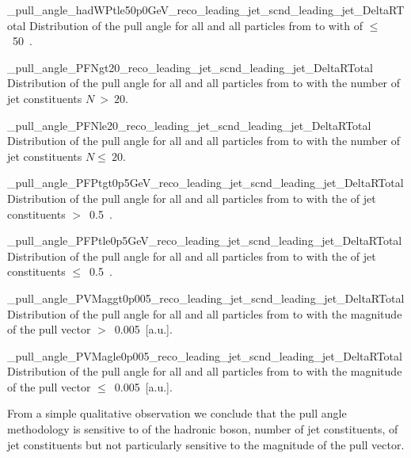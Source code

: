      {_pull_angle_hadWPtle50p0GeV_reco_leading_jet_scnd_leading_jet_DeltaRTotal}
     {Distribution of the pull angle for all \DeltaR and all particles from \leadingjet to \scndleadingjet with \pt of \PW $\leq$~50~\GeV.}

     {_pull_angle_PFNgt20_reco_leading_jet_scnd_leading_jet_DeltaRTotal}
     {Distribution of the pull angle for all \DeltaR and all particles from \leadingjet to \scndleadingjet with the number of jet constituents $N~>~20$.}

     {_pull_angle_PFNle20_reco_leading_jet_scnd_leading_jet_DeltaRTotal}
     {Distribution of the pull angle for all \DeltaR and all particles from \leadingjet to \scndleadingjet with the number of jet constituents $N\leq~20$.}

     {_pull_angle_PFPtgt0p5GeV_reco_leading_jet_scnd_leading_jet_DeltaRTotal}
     {Distribution of the pull angle for all \DeltaR and all particles from \leadingjet to \scndleadingjet with the \pt of jet constituents $>$~0.5~\GeV.}

     {_pull_angle_PFPtle0p5GeV_reco_leading_jet_scnd_leading_jet_DeltaRTotal}
     {Distribution of the pull angle for all \DeltaR and all particles from \leadingjet to \scndleadingjet with the \pt of jet constituents $\leq$~0.5~\GeV.}

     {_pull_angle_PVMaggt0p005_reco_leading_jet_scnd_leading_jet_DeltaRTotal}
     {Distribution of the pull angle for all \DeltaR and all particles from \leadingjet to \scndleadingjet with the magnitude of the pull vector $>$~0.005~[a.u.].}

    {_pull_angle_PVMagle0p005_reco_leading_jet_scnd_leading_jet_DeltaRTotal}
    {Distribution of the pull angle for all \DeltaR and all particles from \leadingjet to \scndleadingjet with the magnitude of the pull vector $\leq$~0.005~[a.u.].}

From a simple qualitative observation we conclude that the pull angle methodology is sensitive to \pt of the hadronic \PW boson, number of jet constituents, \pt of jet constituents but not particularly sensitive to the magnitude of the pull vector.



